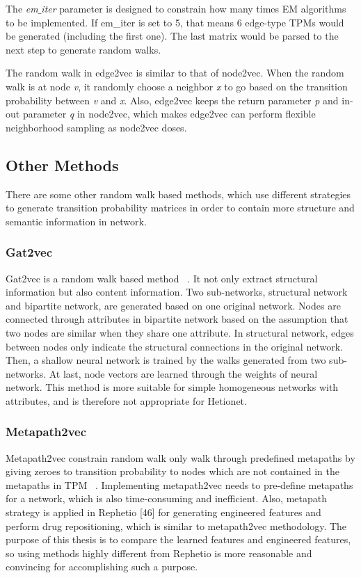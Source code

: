 The \textit{em$\_$iter} parameter is designed to constrain how many times EM algorithms to be implemented. If em\_iter is set to 5, that means 6 edge-type \ac{TPM}s would be generated (including the first one). The last matrix would be parsed to the next step to generate random walks.

The random walk in edge2vec is similar to that of node2vec. When the random walk is at node \textit{v}, it randomly choose a neighbor \textit{x} to go based on the transition probability between \textit{v} and \textit{x}. Also, edge2vec keeps the return parameter \textit{p} and in-out parameter \textit{q} in node2vec, which makes edge2vec can perform flexible neighborhood sampling as node2vec doses.

\subsection{Other Methods}

There are some other random walk based methods, which use different strategies to generate transition probability matrices in order to contain more structure and semantic information in network. 

\subsubsection{Gat2vec}

Gat2vec is a random walk based method ~\cite{sheikh_gat2vec:_2019}. It not only extract structural information but also content information. Two sub-networks, structural network and bipartite network, are generated based on one original network. Nodes are connected through attributes in bipartite network based on the assumption that two nodes are similar when they share one attribute. In structural network, edges between nodes only indicate the structural connections in the original network. Then, a shallow neural network is trained by the walks generated from two sub-networks. At last, node vectors are learned through the weights of neural network. This method is more suitable for simple homogeneous networks with attributes, and is therefore not appropriate for Hetionet.

\subsubsection{Metapath2vec}

Metapath2vec constrain random walk only walk through predefined metapaths by giving zeroes to transition probability to nodes which are not contained in the metapaths in \ac{TPM} ~\cite{dong_metapath2vec:_2017}. Implementing metapath2vec needs to pre-define metapaths for a network, which is also time-consuming and inefficient. Also, metapath strategy is applied in Rephetio [46] for generating engineered features and perform drug repositioning, which is similar to metapath2vec methodology. The purpose of this thesis is to compare the learned features and engineered features, so using methods highly different from Rephetio is more reasonable and convincing for accomplishing such a purpose.



